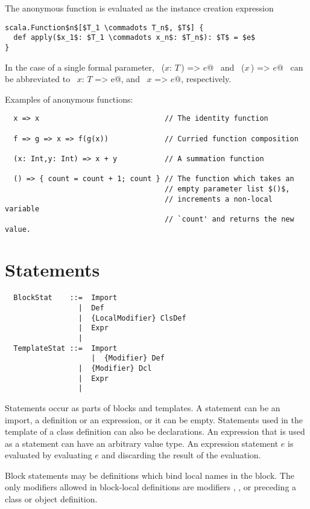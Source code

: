 \documentclass[a4paper,12pt,twoside,titlepage]{book}
\begin{document}
The anonymous function is evaluated as the instance creation expression
\begin{lstlisting}
scala.Function$n$[$T_1 \commadots T_n$, $T$] {
  def apply($x_1$: $T_1 \commadots x_n$: $T_n$): $T$ = $e$
}
\end{lstlisting}
In the case of a single formal parameter, ~\lstinline@($x$: $T\,$) => $e$@~ and ~\lstinline@($x\,$) => $e$@~ 
can be abbreviated to ~\lstinline@$x$: $T$ => e@, and ~\lstinline@$x$ => $e$@, respectively.

\example Examples of anonymous functions:

\begin{lstlisting}
  x => x                             // The identity function

  f => g => x => f(g(x))             // Curried function composition

  (x: Int,y: Int) => x + y           // A summation function

  () => { count = count + 1; count } // The function which takes an
                                     // empty parameter list $()$, 
                                     // increments a non-local variable 
                                     // `count' and returns the new value.
\end{lstlisting}

\section{Statements}
\label{sec:statements}

\syntax\begin{lstlisting}
  BlockStat    ::=  Import
                 |  Def
                 |  {LocalModifier} ClsDef
                 |  Expr
                 | 
  TemplateStat ::=  Import
                    |  {Modifier} Def
                 |  {Modifier} Dcl
                 |  Expr
                 | 
\end{lstlisting}

Statements occur as parts of blocks and templates.  A statement can be
an import, a definition or an expression, or it can be empty.
Statements used in the template of a class definition can also be
declarations.  An expression that is used as a statement can have an
arbitrary value type. An expression statement $e$ is evaluated by
evaluating $e$ and discarding the result of the evaluation. 

Block statements may be definitions which bind local names in the
block. The only modifiers allowed in block-local definitions are modifiers
, , or  preceding a class or
object definition.
\end{document}
